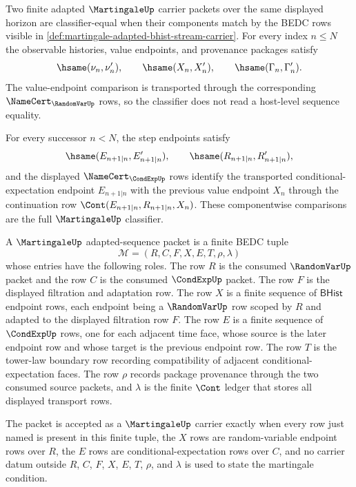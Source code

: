 \begin{definition}
\label{def:martingale-condexp-step-classifier}
Two finite adapted $\MartingaleUp$ carrier packets over the same displayed
horizon are classifier-equal when their components match by the BEDC rows
visible in \autoref{def:martingale-adapted-bhist-stream-carrier}. For every
index $n\leq N$ the observable histories, value endpoints, and provenance
packages satisfy
$$
\hsame(\nu_n,\nu'_n),\qquad
\hsame(X_n,X'_n),\qquad
\hsame(\Gamma_n,\Gamma'_n).
$$
The value-endpoint comparison is transported through the corresponding
$\NameCert_{\RandomVarUp}$ rows, so the classifier does not read a host-level
sequence equality.

For every successor $n<N$, the step endpoints satisfy
$$
\hsame(E_{n+1|n},E'_{n+1|n}),\qquad
\hsame(R_{n+1|n},R'_{n+1|n}),
$$
and the displayed $\NameCert_{\CondExpUp}$ rows identify the transported
conditional-expectation endpoint $E_{n+1|n}$ with the previous value endpoint
$X_n$ through the continuation row $\Cont(E_{n+1|n},R_{n+1|n},X_n)$. These
componentwise comparisons are the full $\MartingaleUp$ classifier.
\end{definition}

\begin{definition}
\label{def:martingale-bhist-adapted-sequence-packet}
A $\MartingaleUp$ adapted-sequence packet is a finite BEDC tuple
$$
\mathcal{M}=(R,C,F,X,E,T,\rho,\lambda)
$$
whose entries have the following roles. The row $R$ is the consumed $\RandomVarUp$ packet and the row $C$ is the consumed $\CondExpUp$ packet. The row $F$ is the displayed filtration and adaptation row. The row $X$ is a finite sequence of $\mathsf{BHist}$ endpoint rows, each endpoint being a $\RandomVarUp$ row scoped by $R$ and adapted to the displayed filtration row $F$. The row $E$ is a finite sequence of $\CondExpUp$ rows, one for each adjacent time face, whose source is the later endpoint row and whose target is the previous endpoint row. The row $T$ is the tower-law boundary row recording compatibility of adjacent conditional-expectation faces. The row $\rho$ records package provenance through the two consumed source packets, and $\lambda$ is the finite $\Cont$ ledger that stores all displayed transport rows.

The packet is accepted as a $\MartingaleUp$ carrier exactly when every row just named is present in this finite tuple, the $X$ rows are random-variable endpoint rows over $R$, the $E$ rows are conditional-expectation rows over $C$, and no carrier datum outside $R$, $C$, $F$, $X$, $E$, $T$, $\rho$, and $\lambda$ is used to state the martingale condition.
\end{definition}

